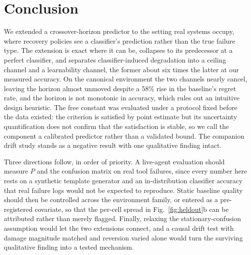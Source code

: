 \documentclass[conference]{IEEEtran}
\begin{document}
\section{Conclusion}

We extended a crossover-horizon predictor to the setting real systems occupy,
where recovery policies see a classifier's prediction rather than the true
failure type. The extension is exact where it can be, collapses to its
predecessor at a perfect classifier, and separates classifier-induced
degradation into a ceiling channel and a learnability channel, the former about
six times the latter at our measured accuracy. On the canonical environment the
two channels nearly cancel, leaving the horizon almost unmoved despite a 58\%
rise in the baseline's regret rate, and the horizon is not monotonic in
accuracy, which rules out an intuitive design heuristic. The free constant was
evaluated under a protocol fixed before the data existed: the criterion is
satisfied by point estimate but its uncertainty quantification does not confirm
that the satisfaction is stable, so we call the component a calibrated
predictor rather than a validated bound. The companion drift study stands as a
negative result with one qualitative finding intact.

Three directions follow, in order of priority. A live-agent evaluation should
measure $P$ and the confusion matrix on real tool failures, since every number
here rests on a synthetic template generator and an in-distribution classifier
accuracy that real failure logs would not be expected to reproduce. Static
baseline quality should then be controlled across the environment family, or
entered as a pre-registered covariate, so that the per-cell spread in
Fig.~\ref{fig:heldout}b can be attributed rather than merely flagged. Finally,
relaxing the stationary-confusion assumption would let the two extensions
connect, and a causal drift test with damage magnitude matched and reversion
varied alone would turn the surviving qualitative finding into a tested
mechanism.
\end{document}
